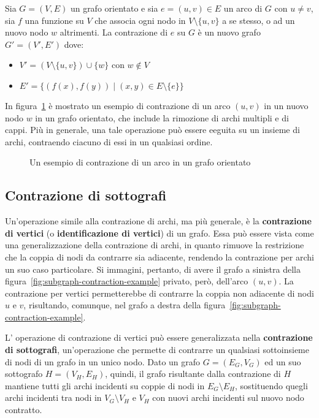 \begin{definition}
Sia $G = (V, E)$ un grafo orientato e sia $e = (u, v) \in E$ un arco di $G$ con $u \neq v$,
sia $f$ una funzione su $V$ che associa ogni nodo in $V \setminus \{u, v\}$ a se stesso, o ad un nuovo nodo $w$
altrimenti. \newline
La contrazione di $e$ su $G$ \`e un nuovo grafo $G' = (V', E')$ dove:
\begin{itemize}
    \item $V' = (V \setminus \{u, v\}) \cup \{w\}$ con $w \notin V$
    \item $E' = \{(f(x), f(y)) \mid (x, y) \in E \setminus \{e\}\}$
\end{itemize}
\end{definition}

In figura~\ref{fig:edge-contraction-example} \`e mostrato un esempio di contrazione di un arco $(u, v)$ in un nuovo
nodo $w$ in un grafo orientato, che include la rimozione di archi multipli e di cappi.
Pi\`u in generale, una tale operazione pu\`o essere eeguita su un insieme di archi, contraendo ciacuno di essi in
un qualsiasi ordine.

\begin{figure}[h]
    \centering
    
    \caption{Un esempio di contrazione di un arco in un grafo orientato}
    \label{fig:edge-contraction-example}
\end{figure}

\subsection{Contrazione di sottografi}\label{subsec:contrazione-di-sottografi}
Un'operazione simile alla contrazione di archi, ma pi\`u generale, \`e la \textbf{contrazione di vertici}
(o \textbf{identificazione di vertici}) di un grafo.
Essa pu\`o essere vista come una generalizzazione della contrazione di archi, in quanto rimuove la restrizione che
la coppia di nodi da contrarre sia adiacente, rendendo la contrazione per archi un suo caso particolare.
Si immagini, pertanto, di avere il grafo a sinistra della figura~\ref{fig:subgraph-contraction-example} privato,
per\`o, dell'arco $(u, v)$.
La contrazione per vertici permetterebbe di contrarre la coppia non adiacente di nodi $u$ e $v$, risultando,
comunque, nel grafo a destra della figura~\ref{fig:subgraph-contraction-example}. \newline

L' operazione di contrazione di vertici pu\`o essere generalizzata nella \textbf{contrazione di sottografi},
un'operazione che permette di contrarre un qualsiasi sottoinsieme di nodi di un grafo in un unico nodo.
Dato un grafo $G = (E_G, V_G)$ ed un suo sottografo $H = (V_H, E_H)$, quindi, il grafo risultante dalla contrazione
di $H$ mantiene tutti gli archi incidenti su coppie di nodi in $E_G \setminus E_H$, sostituendo
quegli archi incidenti tra nodi in $V_G \setminus V_H$ e $V_H$ con nuovi archi incidenti sul nuovo nodo contratto.

